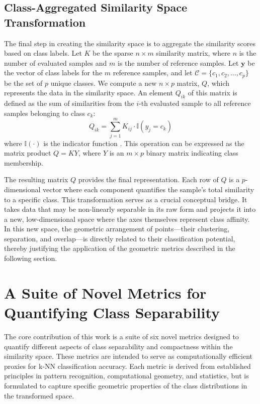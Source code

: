 \documentclass[conference]{IEEEtran}
\begin{document}
\subsection{Class-Aggregated Similarity Space Transformation}
The final step in creating the similarity space is to aggregate the similarity scores based on class labels. Let $K$ be the sparse $n \times m$ similarity matrix, where $n$ is the number of evaluated samples and $m$ is the number of reference samples. Let $\mathbf{y}$ be the vector of class labels for the $m$ reference samples, and let $\mathcal{C} = \{c_1, c_2, \ldots, c_p\}$ be the set of $p$ unique classes. We compute a new $n \times p$ matrix, $Q$, which represents the data in the similarity space. An element $Q_{ik}$ of this matrix is defined as the sum of similarities from the $i$-th evaluated sample to all reference samples belonging to class $c_k$:
\begin{equation}
Q_{ik} = \sum_{j=1}^{m} K_{ij} \cdot \mathbb{I}(y_j = c_k)
\end{equation}
where $\mathbb{I}(\cdot)$ is the indicator function \cite{b20}. This operation can be expressed as the matrix product $Q = KY$, where $Y$ is an $m \times p$ binary matrix indicating class membership.

The resulting matrix $Q$ provides the final representation. Each row of $Q$ is a $p$-dimensional vector where each component quantifies the sample's total similarity to a specific class. This transformation serves as a crucial conceptual bridge. It takes data that may be non-linearly separable in its raw form and projects it into a new, low-dimensional space where the axes themselves represent class affinity. In this new space, the geometric arrangement of points—their clustering, separation, and overlap—is directly related to their classification potential, thereby justifying the application of the geometric metrics described in the following section.

\section{A Suite of Novel Metrics for Quantifying Class Separability}
The core contribution of this work is a suite of six novel metrics designed to quantify different aspects of class separability and compactness within the similarity space. These metrics are intended to serve as computationally efficient proxies for k-NN classification accuracy. Each metric is derived from established principles in pattern recognition, computational geometry, and statistics, but is formulated to capture specific geometric properties of the class distributions in the transformed space.
\end{document}
